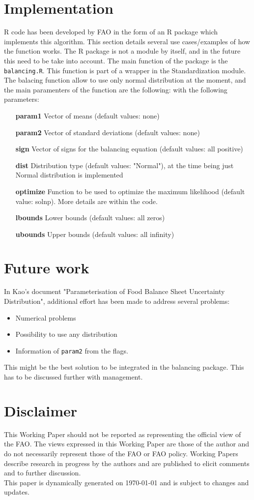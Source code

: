 \documentclass[nojss]{jss}
\begin{document}
\section{Implementation}
R code has been developed by FAO in the form of an R package which implements this algorithm.  This section details several use cases/examples of how the function works. The R package is not a module by itself, and in the future this need to be take into account.
The main function of the package is the {\tt balancing.R}. This function is part of a wrapper in the Standardization module. The balacing function allow to use only normal distribution at the moment, and the main paramenters of the function are the following: with the following parameters:
\begin{itemize}
\item[{\bf param1}] Vector of means (default values: none)
\item[{\bf param2}] Vector of standard deviations (default values: none)
\item[{\bf sign}] Vector of signs for the balancing equation (default values: all positive)
\item[{\bf dist}] Distribution type (default values: "Normal"), at the time being just Normal distribution is implemented
\item[{\bf optimize}] Function to be used to optimize the maximum likelihood (default value: solnp). More details are within the code.
\item[{\bf lbounds}] Lower bounds (default values: all zeros)
\item[{\bf ubounds}] Upper bounds (default values: all infinity)
\end{itemize}


\newpage
\section{Future work}
In Kao's document "Parameterisation of Food Balance Sheet Uncertainty Distribution", additional effort has been made to address several problems: 
\begin{itemize}
\item Numerical problems
\item Possibility to use any distribution
\item Information of {\tt param2} from the flags.
\end{itemize}
This might be the best solution to be integrated in the balancing package. This has to be discussed further with management.

\section*{Disclaimer}
This Working Paper should not be reported as representing the official view of
the FAO. The views expressed in this Working Paper are those of the
author and do not necessarily represent those of the FAO or FAO
policy. Working Papers describe research in progress by the authors and
are published to elicit comments and to further discussion.\\

This paper is dynamically generated on \today{} and is subject to
changes and updates.
\end{document}
